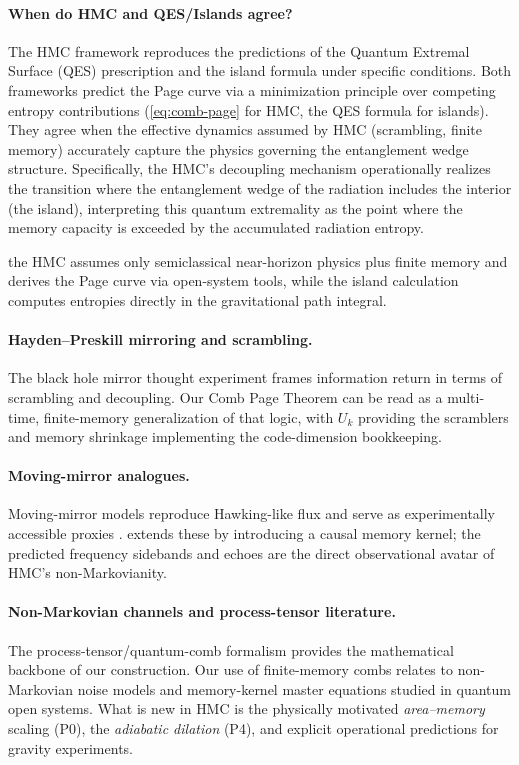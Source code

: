 \documentclass[a4paper,11pt]{article}
\newcommand{\HMC}{\textsc{HMC}\xspace}
\theoremstyle{plain}
\theoremstyle{definition}
\theoremstyle{remark}
\begin{document}
\paragraph{When do \HMC{} and QES/Islands agree?}
The \HMC{} framework reproduces the predictions of the Quantum Extremal Surface (QES) prescription and the island formula under specific conditions. Both frameworks predict the Page curve via a minimization principle over competing entropy contributions (\eqref{eq:comb-page} for \HMC{}, the QES formula for islands). They agree when the effective dynamics assumed by \HMC{} (scrambling, finite memory) accurately capture the physics governing the entanglement wedge structure. Specifically, the \HMC{}'s decoupling mechanism operationally realizes the transition where the entanglement wedge of the radiation includes the interior (the island), interpreting this quantum extremality as the point where the memory capacity is exceeded by the accumulated radiation entropy.


the \HMC{} assumes only semiclassical near-horizon physics plus finite memory and derives the Page curve via open-system tools,
while the island calculation computes entropies directly in the gravitational path integral.

\paragraph{Hayden--Preskill mirroring and scrambling.}
The black hole mirror thought experiment \cite{Hayden:2007} frames information return in terms of scrambling and decoupling.
Our Comb Page Theorem can be read as a multi-time, finite-memory generalization of that logic, with $U_k$ providing the scramblers
and memory shrinkage implementing the code-dimension bookkeeping.

\paragraph{Moving-mirror analogues.}
Moving-mirror models reproduce Hawking-like flux and serve as experimentally accessible proxies \cite{FullingDavies:1976,GoodLinder:2017}.
 extends these by introducing a causal memory kernel; the predicted frequency sidebands and echoes
are the direct observational avatar of \HMC{}'s non-Markovianity.

\paragraph{Non-Markovian channels and process-tensor literature.}
The process-tensor/quantum-comb formalism \cite{Chiribella:2009} provides the mathematical backbone of our construction.
Our use of finite-memory combs relates to non-Markovian noise models and memory-kernel master equations studied in quantum open systems.
What is new in \HMC{} is the physically motivated \emph{area--memory} scaling (P0), the \emph{adiabatic dilation} (P4),
and explicit operational predictions for gravity experiments.
\end{document}

